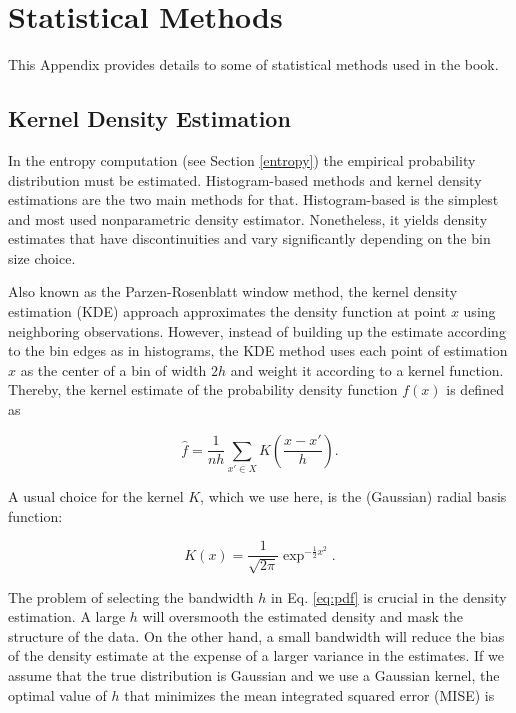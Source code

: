 \documentclass[]{book}
\theoremstyle{definition}
\theoremstyle{definition}
\theoremstyle{definition}
\theoremstyle{remark}
\begin{document}
\appendix {}


\chapter{Statistical Methods}\label{statistical-methods}

This Appendix provides details to some of statistical methods used in
the book.

\section{Kernel Density Estimation}\label{kde}

In the entropy computation (see Section \ref{entropy}) the empirical
probability distribution must be estimated. Histogram-based methods and
kernel density estimations are the two main methods for that.
Histogram-based is the simplest and most used nonparametric density
estimator. Nonetheless, it yields density estimates that have
discontinuities and vary significantly depending on the bin size choice.

Also known as the Parzen-Rosenblatt window method, the kernel density
estimation (KDE) approach approximates the density function at point
\(x\) using neighboring observations. However, instead of building up
the estimate according to the bin edges as in histograms, the KDE method
uses each point of estimation \(x\) as the center of a bin of width
\(2h\) and weight it according to a kernel function. Thereby, the kernel
estimate of the probability density function \(f(x)\) is defined as

\begin{equation}
\hat{f} = \frac{1}{nh}\sum_{x' \in X}{K\left(\frac{x - x'}{h}\right)}. 
\label{eq:pdf}
\end{equation}

A usual choice for the kernel \(K\), which we use here, is the
(Gaussian) radial basis function:

\begin{equation}
K(x) = \frac{1}{\sqrt{2\pi}}\exp^{-\frac{1}{2}x^2}. 
\end{equation}

The problem of selecting the bandwidth \(h\) in Eq. \eqref{eq:pdf} is
crucial in the density estimation. A large \(h\) will oversmooth the
estimated density and mask the structure of the data. On the other hand,
a small bandwidth will reduce the bias of the density estimate at the
expense of a larger variance in the estimates. If we assume that the
true distribution is Gaussian and we use a Gaussian kernel, the optimal
value of \(h\) that minimizes the mean integrated squared error (MISE)
is
\end{document}
